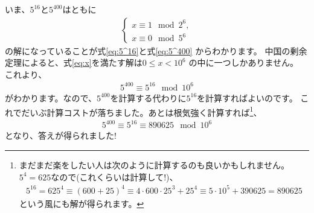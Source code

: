 \documentclass{jsarticle}
\begin{document}
いま、$5^{16}$と$5^{400}$はともに
\begin{align}
\left\{
\begin{array}{l}
x\equiv 1 \mod 2^{6},\\
x\equiv 0 \mod 5^{6}
\end{array}
\right.
\label{eq:x}
\end{align}
の解になっていることが式\eqref{eq:5^16}と式\eqref{eq:5^400}
からわかります。
中国の剰余定理によると、式\eqref{eq:x}を満たす解は$0\leq x<10^{6}$
の中に一つしかありません。
これより、
\begin{align}
5^{400}\equiv 5^{16}\mod 10^{6}
\end{align}
がわかります。なので、$5^{400}$を計算する代わりに$5^{16}$を計算すればよいのです。
これでだいぶ計算コストが落ちました。あとは根気強く計算すれば\footnote{
まだまだ楽をしたい人は次のように計算するのも良いかもしれません。
$5^{4}=625$なので(これくらいは計算して!)、
\begin{align*}
5^{16}=625^{4}\equiv(600+25)^4
\equiv 4\cdot 600\cdot25^{3}+25^{4}
\equiv 5\cdot 10^{5}+390625=890625
\end{align*}
という風にも解が得られます。
}、
\begin{align}
5^{400}\equiv 5^{16}\equiv 890625 \mod 10^{6}
\end{align}
となり、答えが得られました!
\end{document}
